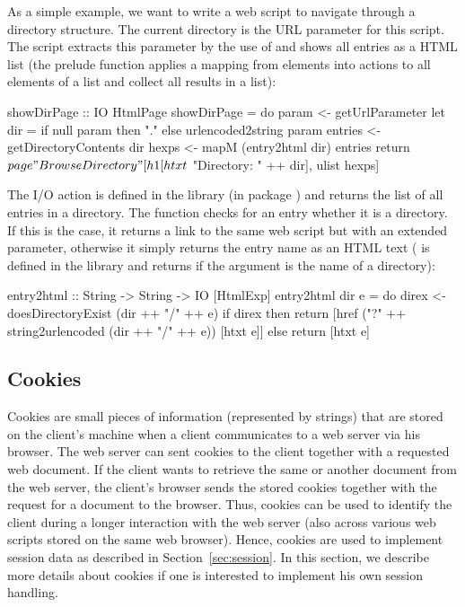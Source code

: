 As a simple example, we want to write a web script to navigate
through a directory structure. The current directory
is the URL parameter for this script. The script
extracts this parameter by the use of 
and shows all entries as a HTML list
(the prelude function  applies
a mapping from elements into actions to all elements of a list
and collect all results in a list):
%
\begin{curry}
showDirPage :: IO HtmlPage
showDirPage = do
  param <- getUrlParameter
  let dir = if null param then "." else urlencoded2string param
  entries <- getDirectoryContents dir
  hexps <- mapM (entry2html dir) entries
  return $ page "Browse Directory"
                [h1 [htxt $ "Directory: " ++ dir], ulist hexps]
\end{curry}
%
The I/O action 
is defined in the library  (in package )
and returns the list of all entries in a directory.
The function  checks for an entry whether it
is a directory. If this is the case, it returns a link to
the same web script but with an extended parameter, otherwise
it simply returns the entry name as an HTML text
(
is defined in the library  and returns 
if the argument is the name of a directory):
%
\begin{curry}
entry2html :: String -> String -> IO [HtmlExp]
entry2html dir e = do
  direx <- doesDirectoryExist (dir ++ "/" ++ e)
  if direx
   then return [href ("?" ++ string2urlencoded (dir ++ "/" ++ e))
                     [htxt e]]
   else return [htxt e]
\end{curry}


\subsection{Cookies}

Cookies are small pieces of information
(represented by strings) that are stored on the client's machine
when a client communicates to a web server via his browser.
The web server can sent cookies to the client together
with a requested web document. If the client wants to retrieve
the same or another document from the web server, the client's browser
sends the stored cookies together with the request for a document
to the browser.
Thus, cookies can be used to identify the client during a longer
interaction with the web server (also across various web scripts
stored on the same web browser).
Hence, cookies are used to implement session data
as described in Section~\ref{sec:session}.
In this section, we describe more details about cookies
if one is interested to implement his own session handling.

